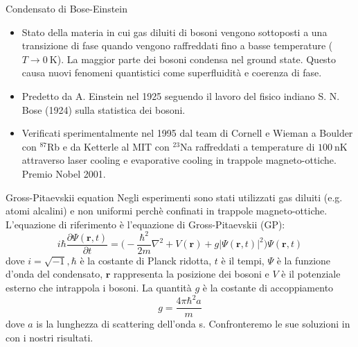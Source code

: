 \documentclass[10pt]{beamer}
\begin{document}
\begin{frame}[fragile]{Condensato di Bose-Einstein}
\begin{itemize}
 	\item Stato della materia in cui gas diluiti di bosoni vengono sottoposti a una transizione di fase quando vengono raffreddati fino a basse temperature ($T\rightarrow 0\ \si{\kelvin}$). La maggior parte dei bosoni condensa nel ground state. Questo causa nuovi fenomeni quantistici come superfluidità e coerenza di fase.
 	\item Predetto da A. Einstein nel 1925 seguendo il lavoro del fisico indiano S. N. Bose (1924) sulla statistica dei bosoni. 
 	\item Verificati sperimentalmente nel 1995 dal team di Cornell e Wieman a Boulder con $^{87}$Rb e da Ketterle al MIT con $^{23}$Na raffreddati a temperature di $100\ \si{\nano\kelvin}$ attraverso laser cooling e evaporative cooling in trappole magneto-ottiche. Premio Nobel 2001.
\end{itemize}
\end{frame}
 

\begin{frame}[fragile]{Gross-Pitaevskii equation}
	Negli esperimenti sono stati utilizzati gas diluiti (e.g. atomi alcalini) e non uniformi perchè confinati in trappole magneto-ottiche. L'equazione di riferimento è l'equazione di Gross-Pitaevskii (GP): 
	\begin{equation*}
	\label{GP}
	i\hbar\frac{\partial \Psi (\mathbf{r},t)}{\partial t}=\bigg(-\frac{\hbar^2}{2m}\nabla^2+V(\mathbf{r})+g|\Psi(\mathbf{r},t)|^2\bigg)\Psi(\mathbf{r},t)
	\end{equation*}
	dove $i=\sqrt{-1}, \hbar$ è la costante di Planck ridotta, $t$ è il tempi, $\Psi$ è la funzione d'onda del condensato, $\mathbf{r}$ rappresenta la posizione dei bosoni e $V$ è il potenziale esterno che intrappola i bosoni. La quantità $g$ è la costante di accoppiamento 
	\begin{equation*}
	g=\frac{4\pi\hbar^2a}{m}
	\end{equation*}
	dove $a$ is la lunghezza di scattering dell'onda s. Confronteremo le sue soluzioni in \cite{DalfString} con i nostri risultati. 
\end{frame}
\end{document}
